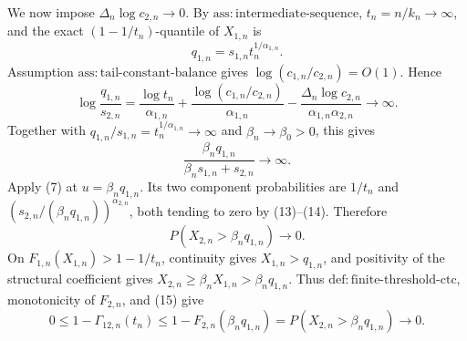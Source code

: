 We now impose \(\Delta_n\log c_{2,n}\to0\). By \(\mathrm{ass{:}intermediate\text{-}sequence}\), \(t_n=n/k_n\to\infty\), and the exact \((1-1/t_n)\)-quantile of \(X_{1,n}\) is
\[
q_{1,n}=s_{1,n}t_n^{1/\alpha_{1,n}}.
\tag{12}
\]
Assumption \(\mathrm{ass{:}tail\text{-}constant\text{-}balance}\) gives \(\log(c_{1,n}/c_{2,n})=O(1)\). Hence
\[
\log\frac{q_{1,n}}{s_{2,n}}
=\frac{\log t_n}{\alpha_{1,n}}
+\frac{\log(c_{1,n}/c_{2,n})}{\alpha_{1,n}}
-\frac{\Delta_n\log c_{2,n}}{\alpha_{1,n}\alpha_{2,n}}
\longrightarrow\infty.
\tag{13}
\]
Together with \(q_{1,n}/s_{1,n}=t_n^{1/\alpha_{1,n}}\to\infty\) and \(\beta_n\to\beta_0>0\), this gives
\[
\frac{\beta_nq_{1,n}}{\beta_ns_{1,n}+s_{2,n}}\to\infty.
\tag{14}
\]
Apply (7) at \(u=\beta_nq_{1,n}\). Its two component probabilities are \(1/t_n\) and \((s_{2,n}/(\beta_nq_{1,n}))^{\alpha_{2,n}}\), both tending to zero by (13)--(14). Therefore
\[
P(X_{2,n}>\beta_nq_{1,n})\to0.
\tag{15}
\]
On \(F_{1,n}(X_{1,n})>1-1/t_n\), continuity gives \(X_{1,n}>q_{1,n}\), and positivity of the structural coefficient gives \(X_{2,n}\geq\beta_nX_{1,n}>\beta_nq_{1,n}\). Thus \(\mathrm{def{:}finite\text{-}threshold\text{-}ctc}\), monotonicity of \(F_{2,n}\), and (15) give
\[
0\leq1-\Gamma_{12,n}(t_n)
\leq1-F_{2,n}(\beta_nq_{1,n})
=P(X_{2,n}>\beta_nq_{1,n})\to0.
\tag{16}
\]

